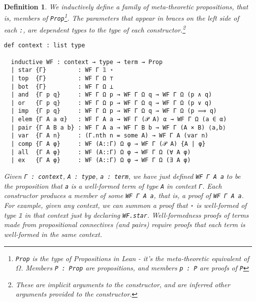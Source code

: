 \documentclass[12pt,leqno]{article}
\def\lc{\lstinline}
\theoremstyle{example}
\newtheorem{definition}[theorem]{Definition}
\numberwithin{equation}{section}
\begin{document}
\begin{definition}
  \label{def:LITTWF}
  We inductively define a family of meta-theoretic propositions, that is, members of \lc{Prop}\footnote{\lc{Prop} is the type of Propositions in Lean - it's the meta-theoretic equivalent of $\Omega$. Members \lc{P : Prop} are propositions, and members \lc{p : P} are proofs of \lc{P}}. The parameters that appear in braces on the left side of each \lc{:}, are dependent types to the type of each constructor.\footnote{These are implicit arguments to the constructor, and are inferred other arguments provided to the constructor.}
  
  \begin{lstlisting}[frame=single]
  def context : list type
  
  inductive WF : context → type → term → Prop
  | star {Γ}         : WF Γ 𝟙 ⋆
  | top  {Γ}         : WF Γ Ω ⊤
  | bot  {Γ}         : WF Γ Ω ⊥
  | and  {Γ p q}     : WF Γ Ω p → WF Γ Ω q → WF Γ Ω (p ∧ q)
  | or   {Γ p q}     : WF Γ Ω p → WF Γ Ω q → WF Γ Ω (p ∨ q)
  | imp  {Γ p q}     : WF Γ Ω p → WF Γ Ω q → WF Γ Ω (p ⟹ q)
  | elem {Γ A a α}   : WF Γ A a → WF Γ (𝒫 A) α → WF Γ Ω (a ∈ α)
  | pair {Γ A B a b} : WF Γ A a → WF Γ B b → WF Γ (A × B) ⟨a,b⟩
  | var  {Γ A n}     : (Γ.nth n = some A) → WF Γ A (var n)
  | comp {Γ A φ}     : WF (A::Γ) Ω φ → WF Γ (𝒫 A) {A | φ}
  | all  {Γ A φ}     : WF (A::Γ) Ω φ → WF Γ Ω (∀ A φ)
  | ex   {Γ A φ}     : WF (A::Γ) Ω φ → WF Γ Ω (∃ A φ)
  \end{lstlisting}

  Given \lc{Γ : context}, \lc{A : type}, \lc{a : term}, we have just defined \lc{WF Γ A a} to be the proposition that \lc{a} is a well-formed term of type \lc{A} in context \lc{Γ}. Each constructor produces a member of some \lc{WF Γ A a}, that is, a \emph{proof} of \lc{WF Γ A a}. For example, given any context, we can summon a proof that \lc{⋆} is well-formed of type \lc{𝟙} in that context just by declaring \lc{WF.star}. Well-formedness proofs of terms made from propositional connectives (and pairs) require proofs that each term is well-formed in the same context.
  
  \vspace{0.1in}


\end{definition}
\end{document}

